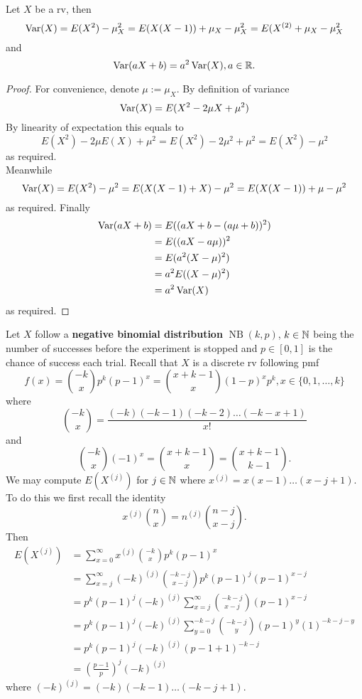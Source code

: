 \documentclass[11pt,fleqn]{book} %
\begin{document}
\begin{theorem} Let \(X\) be a rv, then
\[
\operatorname{Var}(X) = E(X^2) - \mu_X^2 = E(X(X - 1)) + \mu_X - \mu_X^2 = E(X^{(2)} + \mu_X - \mu_X^2
\]
and
\[
\operatorname{Var}(aX + b) = a^2 \operatorname{Var}(X), a \in \mathbb{R}.
\]
\end{theorem}
\begin{proof} For convenience, denote \(\mu := \mu_X\). By definition of variance
\[
\operatorname{Var}(X) = E(X^2 - 2\mu X + \mu^2)
\]
\indent By linearity of expectation this equals to
\[
E(X^2) - 2\mu E(X) + \mu^2 = E(X^2) - 2\mu^2 + \mu^2 = E(X^2) - \mu^2
\]
as required.\\
\indent Meanwhile
\[
\operatorname{Var}(X) = E(X^2) - \mu^2 = E(X(X - 1) + X) - \mu^2 = E(X(X - 1)) + \mu - \mu^2
\]
as required. Finally
\[
\begin{aligned}
\operatorname{Var}(aX + b) &= E((aX + b - (a\mu + b))^2) \\
&= E((aX - a\mu))^2 \\
&= E(a^2 (X - \mu)^2) \\
&= a^2 E((X - \mu)^2) \\
&= a^2 \operatorname{Var}(X)
\end{aligned}
\]
as required.
\end{proof}

\begin{example} 
Let \(X\) follow a \textbf{negative binomial distribution} \(\operatorname{NB}(k, p)\), \(k \in \mathbb{N}\) being the number of successes before the experiment is stopped and \(p \in [0, 1]\) is the chance of success each trial. Recall that \(X\) is a discrete rv following pmf
\[
f(x) = \binom{-k}{x}p^k(p-1)^x = \binom{x + k - 1}{x}(1 - p)^x p^k, x \in \{0, 1, \ldots, k\}
\]
where
\[
\binom{-k}{x} = \frac{(-k)(-k-1)(-k-2)\ldots(-k-x+1)}{x!}
\]
and
\[
\binom{-k}{x}(-1)^x = \binom{x + k - 1}{x} = \binom{x + k - 1}{k - 1}.
\]
\indent We may compute \(E(X^{(j)})\) for \(j \in \mathbb{N}\) where \(x^{(j)} = x(x-1)\ldots(x - j + 1)\). To do this we first recall the identity
\[
x^{(j)}\binom{n}{x} = n^{(j)}\binom{n - j}{x - j}.
\]
\indent Then
\[
\begin{aligned}
E(X^{(j)}) &= \sum_{x = 0}^\infty x^{(j)} \binom{-k}{x}p^k(p-1)^x \\
&= \sum_{x = j}^\infty(-k)^{(j)}\binom{-k-j}{x-j}p^k(p-1)^j(p-1)^{x - j} \\
&= p^k(p-1)^j(-k)^{(j)} \sum_{x=j}^\infty\binom{-k-j}{x-j}(p-1)^{x - j} \\
&= p^k(p-1)^j(-k)^{(j)}\sum_{y=0}^{-k-j}\binom{-k-j}{y} (p-1)^y (1)^{-k-j-y} \\
&= p^k(p - 1)^j(-k)^{(j)}(p - 1 + 1)^{-k-j} \\
&= \left(\frac{p-1}{p}\right)^j(-k)^{(j)}
\end{aligned}
\]
where \((-k)^{(j)} = (-k)(-k-1)\ldots(-k-j+1)\).
\end{example}
\end{document}
